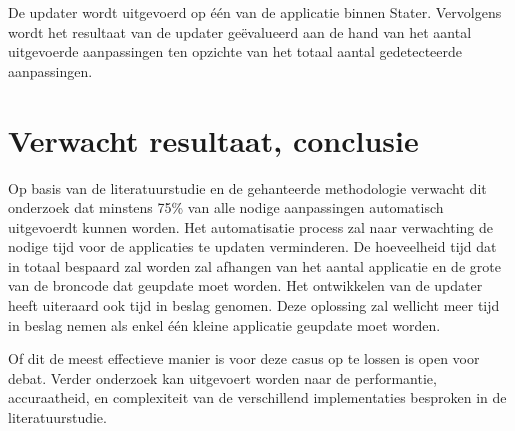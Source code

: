 De updater wordt uitgevoerd op één van de applicatie binnen Stater.
Vervolgens wordt het resultaat van de updater geëvalueerd aan de hand van het aantal uitgevoerde aanpassingen ten opzichte van het totaal aantal gedetecteerde aanpassingen.

\section{Verwacht resultaat, conclusie}
\label{sec:verwachte_resultaten}

Op basis van de literatuurstudie en de gehanteerde methodologie verwacht dit onderzoek dat minstens 75\% van alle nodige aanpassingen automatisch uitgevoerdt kunnen worden.
Het automatisatie process zal naar verwachting de nodige tijd voor de applicaties te updaten verminderen.
De hoeveelheid tijd dat in totaal bespaard zal worden zal afhangen van het aantal applicatie en de grote van de broncode dat geupdate moet worden.
Het ontwikkelen van de updater heeft uiteraard ook tijd in beslag genomen.
Deze oplossing zal wellicht meer tijd in beslag nemen als enkel één kleine applicatie geupdate moet worden.

Of dit de meest effectieve manier is voor deze casus op te lossen is open voor debat.
Verder onderzoek kan uitgevoert worden naar de performantie, accuraatheid, en complexiteit van de verschillend implementaties besproken in de literatuurstudie.


